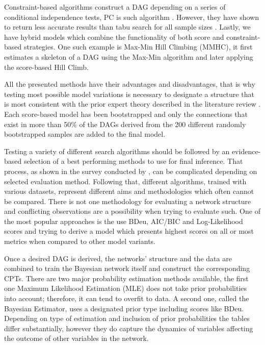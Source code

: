 \documentclass[12pt, letterpaper]{article}
\begin{document}
Constraint-based algorithms construct a DAG depending on a series of conditional independence tests, PC is such algorithm \parencite{colombo2014}. However, they have shown to return less accurate results than tabu search for all sample sizes \parencite{scutari2019}. Lastly, we have hybrid models which combine the functionality of both score and constraint-based strategies. One such example is Max-Min Hill Climbing (MMHC), it first estimates a skeleton of a DAG using the Max-Min algorithm and later applying the score-based Hill Climb.

All the presented methods have their advantages and disadvantages, that is why testing most possible model variations is necessary to designate a structure that is most consistent with the prior expert theory described in the literature review \parencite{scutari2013}. Each score-based model has been bootstrapped and only the connections that exist in more than 50\% of the DAGs derived from the 200 different randomly bootstrapped samples are added to the final model.

Testing a variety of different search algorithms should be followed by an evidence-based selection of a best performing methods to use for final inference. That process, as shown in the survey conducted by \textcite{kitson2023}, can be complicated depending on selected evaluation method. Following that, different algorithms, trained with various datasets, represent different aims and methodologies which often cannot be compared. There is not one methodology for evaluating a network structure and conflicting observations are a possibility when trying to evaluate such. One of the most popular approaches is the use BDeu, AIC/BIC and Log-Likelihood scores and trying to derive a model which presents highest scores on all or most metrics when compared to other model variants.

Once a desired DAG is derived, the networks’ structure and the data are combined to train the Bayesian network itself and construct the corresponding CPTs. There are two major probability estimation methods available, the first one Maximum Likelihood Estimation (MLE) does not take prior probabilities into account; therefore, it can tend to overfit to data. A second one, called the Bayesian Estimator, uses a designated prior type including scores like BDeu. Depending on type of estimation and inclusion of prior probabilities the tables differ substantially, however they do capture the dynamics of variables affecting the outcome of other variables in the network.
\end{document}
